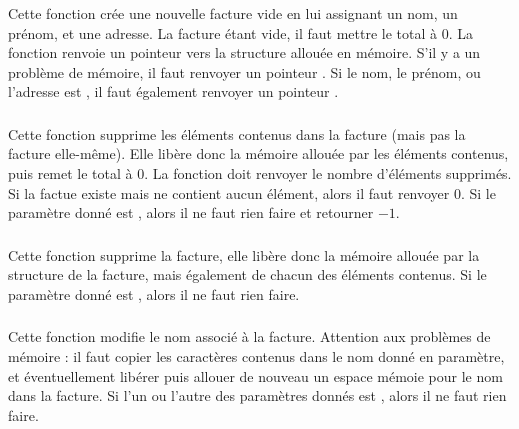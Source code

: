 \noindent Cette fonction crée une nouvelle facture vide en lui assignant un nom, un prénom, et une adresse.
La facture étant vide, il faut mettre le total à $ 0 $.
La fonction renvoie un pointeur vers la structure allouée en mémoire.
S'il y a un problème de mémoire, il faut renvoyer un pointeur .
Si le nom, le prénom, ou l'adresse est , il faut également renvoyer un pointeur .

\bigskip


\subsubsection*{}

\noindent Cette fonction supprime les éléments contenus dans la facture (mais pas la facture elle-même).
Elle libère donc la mémoire allouée par les éléments contenus, puis remet le total à $ 0 $.
La fonction doit renvoyer le nombre d'éléments supprimés.
Si la factue existe mais ne contient aucun élément, alors il faut renvoyer $ 0 $.
Si le paramètre donné est , alors il ne faut rien faire et retourner $ -1 $.

\bigskip


\subsubsection*{}

\noindent Cette fonction supprime la facture, elle libère donc la mémoire allouée par la structure de la facture, mais également de chacun des éléments contenus.
Si le paramètre donné est , alors il ne faut rien faire.

\bigskip


\subsubsection*{}

\noindent Cette fonction modifie le nom associé à la facture.
Attention aux problèmes de mémoire : il faut copier les caractères contenus dans le nom donné en paramètre, et éventuellement libérer puis allouer de nouveau un espace mémoie pour le nom dans la facture.
Si l'un ou l'autre des paramètres donnés est , alors il ne faut rien faire.

\bigskip


\subsubsection*{}


